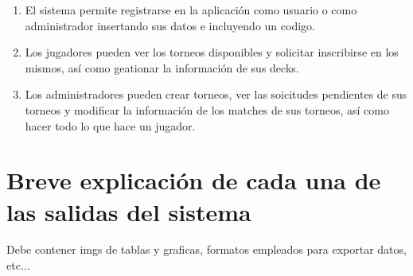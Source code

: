 \documentclass[a4paper]{article}
\begin{document}
\begin{enumerate}
\item El sistema permite registrarse en la aplicaci\'on como usuario o como administrador insertando sus datos e incluyendo un codigo.
\item Los jugadores pueden ver los torneos disponibles y solicitar inscribirse en los mismos, as\'i como geationar la informaci\'on de sus decks.
\item Los administradores pueden crear torneos, ver las soicitudes pendientes de sus torneos y modificar la informaci\'on de los matches de sus torneos, as\'i como hacer todo lo que hace un jugador.
\end{enumerate}

\newpage

\section{Breve explicaci\'on de cada una de las salidas del sistema}
Debe contener imgs de tablas y graficas,  formatos empleados para exportar datos, etc... 
\end{document}
